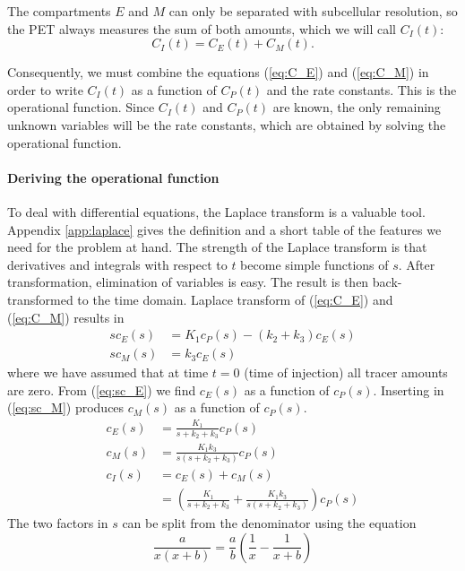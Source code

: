 \documentclass[11pt,oneside]{book}
\begin{document}
The compartments $E$ and $M$ can only be separated with subcellular
resolution, so the PET always measures the sum of both amounts, which we will
call $C_I(t)$:
\begin{equation}
  C_I(t) = C_E(t) + C_M(t).
\end{equation}

Consequently, we must combine the equations (\ref{eq:C_E}) and (\ref{eq:C_M})
in order to write $C_I(t)$ as a function of $C_P(t)$ and the rate
constants. This is the operational function. Since $C_I(t)$ and $C_P(t)$ are
known, the only remaining unknown variables will be the rate constants, which
are obtained by solving the operational function.

\paragraph{Deriving the operational function\\}
To deal with differential equations, the Laplace transform is a valuable
tool. Appendix \ref{app:laplace} gives the definition and a short table of the
features we need for the problem at hand. The strength of the Laplace
transform is that derivatives and integrals with respect to $t$ become simple
functions of $s$. After transformation, elimination of variables is easy. The
result is then back-transformed to the time domain.  Laplace transform of
(\ref{eq:C_E}) and (\ref{eq:C_M}) results in
\begin{align}
  s c_E(s) &= K_1 c_P(s) - (k_2 + k_3) c_E(s) \label{eq:sc_E}\\
  s c_M(s) &= k_3 c_E(s)  \label{eq:sc_M}
\end{align}
where we have assumed that at time $t=0$ (time of injection) all tracer
amounts are zero.  From (\ref{eq:sc_E}) we find $c_E(s)$ as a function of
$c_P(s)$. Inserting in (\ref{eq:sc_M}) produces $c_M(s)$ as a function of
$c_P(s)$.
\begin{align}
  c_E(s) &= \frac{K_1}{s + k_2 + k_3} c_P(s)\\
  c_M(s) &= \frac{K_1 k_3}{s (s + k_2 + k_3)} c_P(s)\\
  c_I(s) &= c_E(s) + c_M(s) \\
         &= \left( \frac{K_1}{s + k_2 + k_3} 
                    + \frac{K_1 k_3}{s (s + k_2 + k_3)}\right) c_P(s)
           \label{eq:c_I}
\end{align}
The two factors in $s$ can be split from the denominator using the equation
\begin{equation}
  \frac{a}{x(x + b)} = \frac{a}{b} \left( \frac{1}{x} - \frac{1}{x+b} \right)
\end{equation}
\end{document}
